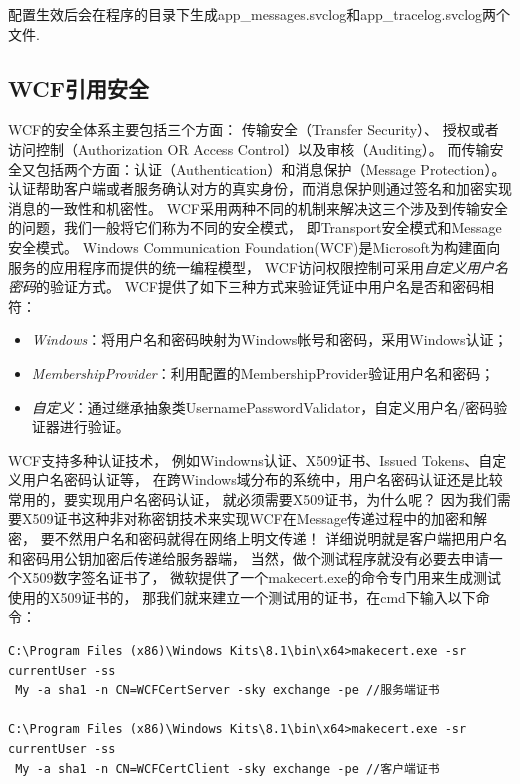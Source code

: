 \documentclass{book}
\begin{document}
配置生效后会在程序的目录下生成app\_messages.svclog和app\_tracelog.svclog两个文件.


\subsection{WCF引用安全}

WCF的安全体系主要包括三个方面：
传输安全（Transfer Security）、 授权或者访问控制（Authorization OR Access Control）以及审核（Auditing）。
而传输安全又包括两个方面：认证（Authentication）和消息保护（Message Protection）。
认证帮助客户端或者服务确认对方的真实身份，而消息保护则通过签名和加密实现消息的一致性和机密性。
WCF采用两种不同的机制来解决这三个涉及到传输安全的问题，我们一般将它们称为不同的安全模式，
即Transport安全模式和Message安全模式。
Windows Communication Foundation(WCF)是Microsoft为构建面向服务的应用程序而提供的统一编程模型，
WCF访问权限控制可采用\emph{自定义用户名密码}的验证方式。
WCF提供了如下三种方式来验证凭证中用户名是否和密码相符：

\begin{itemize}
\item{\emph{Windows}：将用户名和密码映射为Windows帐号和密码，采用Windows认证；}
\item{\emph{MembershipProvider}：利用配置的MembershipProvider验证用户名和密码；}
\item{\emph{自定义}：通过继承抽象类UsernamePasswordValidator，自定义用户名/密码验证器进行验证。}
\end{itemize}

WCF支持多种认证技术，
例如Windowns认证、X509证书、Issued Tokens、自定义用户名密码认证等，
在跨Windows域分布的系统中，用户名密码认证还是比较常用的，要实现用户名密码认证，
就必须需要X509证书，为什么呢？
因为我们需要X509证书这种非对称密钥技术来实现WCF在Message传递过程中的加密和解密，
要不然用户名和密码就得在网络上明文传递！
详细说明就是客户端把用户名和密码用公钥加密后传递给服务器端，
当然，做个测试程序就没有必要去申请一个X509数字签名证书了，
微软提供了一个makecert.exe的命令专门用来生成测试使用的X509证书的，
那我们就来建立一个测试用的证书，在cmd下输入以下命令： 

\begin{lstlisting}
C:\Program Files (x86)\Windows Kits\8.1\bin\x64>makecert.exe -sr currentUser -ss
 My -a sha1 -n CN=WCFCertServer -sky exchange -pe //服务端证书
 
C:\Program Files (x86)\Windows Kits\8.1\bin\x64>makecert.exe -sr currentUser -ss
 My -a sha1 -n CN=WCFCertClient -sky exchange -pe //客户端证书
\end{lstlisting}
\end{document}
